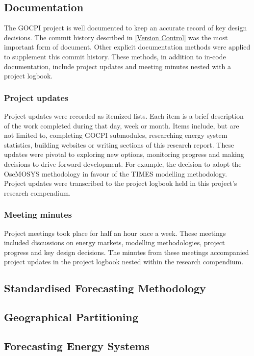 \documentclass[12pt]{article}
\begin{document}
\subsection{Documentation}
The GOCPI project is well documented to keep an accurate record of key design decisions.
The commit history described in \ref{Version Control} was the most important form of document.
Other explicit documentation methods were applied to supplement this commit history. 
These methods, in addition to in-code documentation, include project updates and meeting minutes
nested with a project logbook.

\subsubsection{Project updates}
Project updates were recorded as itemized lists.
Each item is a brief description of the work completed during that day, week or month.
Items include, but are not limited to, completing GOCPI submodules, researching energy system statistics, building websites or writing sections of this research report.
These updates were pivotal to exploring new options, monitoring progress and making decisions to drive forward development. 
For example, the decision to adopt the OseMOSYS methodology in favour of the TIMES modelling methodology.
Project updates were transcribed to the project logbook held in this project's research compendium.

\subsubsection{Meeting minutes}
Project meetings took place for half an hour once a week. 
These meetings included discussions on energy markets, modelling methodologies, project progress and key design decisions.
The minutes from these meetings accompanied project updates in the project logbook nested within the research compendium.

\subsection{Standardised Forecasting Methodology}
\subsection{Geographical Partitioning}
\subsection{Forecasting Energy Systems}
\end{document}
